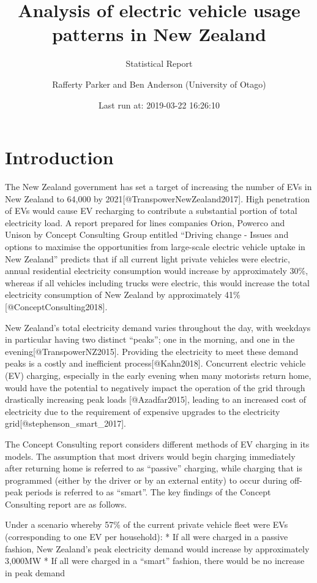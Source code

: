 \documentclass[]{article}
\title{Analysis of electric vehicle usage patterns in New Zealand}
\subtitle{Statistical Report}
\author{Rafferty Parker and Ben Anderson (University of Otago)}
\date{Last run at: 2019-03-22 16:26:10}
\begin{document}
\maketitle

{
\setcounter{tocdepth}{2}
\tableofcontents
}
\section{Introduction}\label{introduction}

The New Zealand government has set a target of increasing the number of
EVs in New Zealand to 64,000 by 2021{[}@TranspowerNewZealand2017{]}.
High penetration of EVs would cause EV recharging to contribute a
substantial portion of total electricity load. A report prepared for
lines companies Orion, Powerco and Unison by Concept Consulting Group
entitled ``Driving change - Issues and options to maximise the
opportunities from large-scale electric vehicle uptake in New Zealand''
predicts that if all current light private vehicles were electric,
annual residential electricity consumption would increase by
approximately 30\%, whereas if all vehicles including trucks were
electric, this would increase the total electricity consumption of New
Zealand by approximately 41\%{[}@ConceptConsulting2018{]}.

New Zealand's total electricity demand varies throughout the day, with
weekdays in particular having two distinct ``peaks''; one in the
morning, and one in the evening{[}@TranspowerNZ2015{]}. Providing the
electricity to meet these demand peaks is a costly and inefficient
process{[}@Kahn2018{]}. Concurrent electric vehicle (EV) charging,
especially in the early evening when many motorists return home, would
have the potential to negatively impact the operation of the grid
through drastically increasing peak loads {[}@Azadfar2015{]}, leading to
an increased cost of electricity due to the requirement of expensive
upgrades to the electricity grid{[}@stephenson\_smart\_2017{]}.

The Concept Consulting report considers different methods of EV charging
in its models. The assumption that most drivers would begin charging
immediately after returning home is referred to as ``passive'' charging,
while charging that is programmed (either by the driver or by an
external entity) to occur during off-peak periods is referred to as
``smart''. The key findings of the Concept Consulting report are as
follows.

Under a scenario whereby 57\% of the current private vehicle fleet were
EVs (corresponding to one EV per household): * If all were charged in a
passive fashion, New Zealand's peak electricity demand would increase by
approximately 3,000MW * If all were charged in a ``smart'' fashion,
there would be no increase in peak demand
\end{document}
